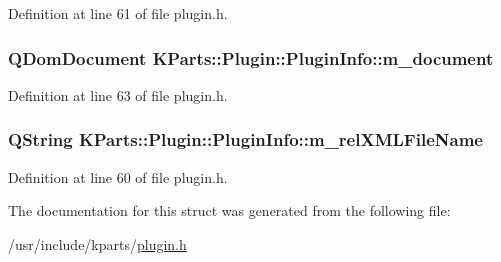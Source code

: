 \-Definition at line 61 of file plugin.\-h.

\hypertarget{structKParts_1_1Plugin_1_1PluginInfo_a5d8acab9612633d4d1f35019213ecadd}{
\subsubsection[{m\-\_\-document}]{\setlength{\rightskip}{0pt plus 5cm}\-Q\-Dom\-Document {\bf \-K\-Parts\-::\-Plugin\-::\-Plugin\-Info\-::m\-\_\-document}}}\label{structKParts_1_1Plugin_1_1PluginInfo_a5d8acab9612633d4d1f35019213ecadd}


\-Definition at line 63 of file plugin.\-h.

\hypertarget{structKParts_1_1Plugin_1_1PluginInfo_a02f9a1972d5e87b2d168fa7c5683649b}{
\subsubsection[{m\-\_\-rel\-X\-M\-L\-File\-Name}]{\setlength{\rightskip}{0pt plus 5cm}\-Q\-String {\bf \-K\-Parts\-::\-Plugin\-::\-Plugin\-Info\-::m\-\_\-rel\-X\-M\-L\-File\-Name}}}\label{structKParts_1_1Plugin_1_1PluginInfo_a02f9a1972d5e87b2d168fa7c5683649b}


\-Definition at line 60 of file plugin.\-h.



\-The documentation for this struct was generated from the following file\-:\begin{DoxyCompactItemize}
\item 
/usr/include/kparts/\hyperlink{plugin_8h}{plugin.\-h}\end{DoxyCompactItemize}
